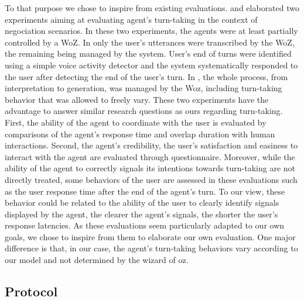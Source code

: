 To that purpose we chose to inspire from existing evaluations.
\cite{skantze_towards_2010} and \cite{de_vault_toward_2015} elaborated two experiments aiming at evaluating agent's turn-taking in the context of negociation scenarios. In these two experiments, the agents were at least partially controlled by a WoZ. In \cite{skantze_towards_2010} only the user's utterances were transcribed by the WoZ, the remaining being managed by the system. User's end of turns were identified using a simple voice activity detector and the system systematically responded to the user after detecting the end of the user's turn. In \cite{de_vault_toward_2015}, the whole process, from interpretation to generation, was managed by the Woz, including turn-taking behavior that was allowed to freely vary. These two experiments have the advantage to answer similar research questions as ours regarding turn-taking. First, the ability of the agent to coordinate with the user is evaluated by comparisons of the agent's response time and overlap duration with human interactions. Second, the agent's credibility, the user's satisfaction and easiness to interact with the agent are evaluated through questionnaire. Moreover, while the ability of the agent to correctly signals its intentions towards turn-taking are not directly treated, some behaviors of the user are assessed in these evaluations such as the user response time after the end of the agent's turn. To our view, these behavior could be related to the ability of the user to clearly identify signals displayed by the agent, the clearer the agent's signals, the shorter the user's response latencies. As these evaluations seem particularly adapted to our own goals, we chose to inspire from them to elaborate our own evaluation. One major difference is that, in our case, the agent's turn-taking behaviors vary according to our model and not determined by the wizard of oz. 

\subsection{Protocol}


%

